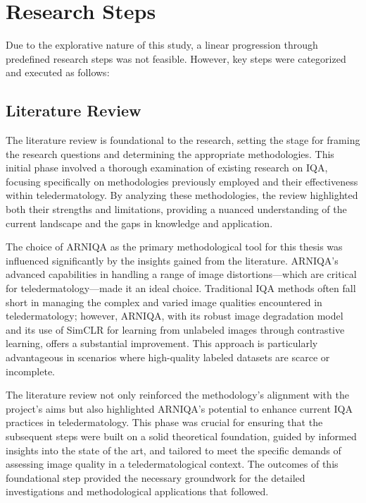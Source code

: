 \section{Research Steps}
\label{sec:ResearchSteps}
Due to the explorative nature of this study, a linear progression through predefined research steps was not feasible. However, key steps were categorized and executed as follows:

\subsection{Literature Review}
\label{sub:LR}
The literature review is foundational to the research, setting the stage for framing the research questions and determining the appropriate methodologies. This initial phase involved a thorough examination of existing research on IQA, focusing specifically on methodologies previously employed and their effectiveness within teledermatology. By analyzing these methodologies, the review highlighted both their strengths and limitations, providing a nuanced understanding of the current landscape and the gaps in knowledge and application.\par
\vspace{\baselineskip}
\noindent
The choice of ARNIQA as the primary methodological tool for this thesis was influenced significantly by the insights gained from the literature. ARNIQA's advanced capabilities in handling a range of image distortions—which are critical for teledermatology—made it an ideal choice. Traditional IQA methods often fall short in managing the complex and varied image qualities encountered in teledermatology; however, ARNIQA, with its robust image degradation model and its use of SimCLR for learning from unlabeled images through contrastive learning, offers a substantial improvement. This approach is particularly advantageous in scenarios where high-quality labeled datasets are scarce or incomplete. \par
\vspace{\baselineskip}
\noindent
The literature review not only reinforced the methodology’s alignment with the project's aims but also highlighted ARNIQA’s potential to enhance current IQA practices in teledermatology. This phase was crucial for ensuring that the subsequent steps were built on a solid theoretical foundation, guided by informed insights into the state of the art, and tailored to meet the specific demands of assessing image quality in a teledermatological context. The outcomes of this foundational step provided the necessary groundwork for the detailed investigations and methodological applications that followed. \par
\vspace{\baselineskip}
\noindent

